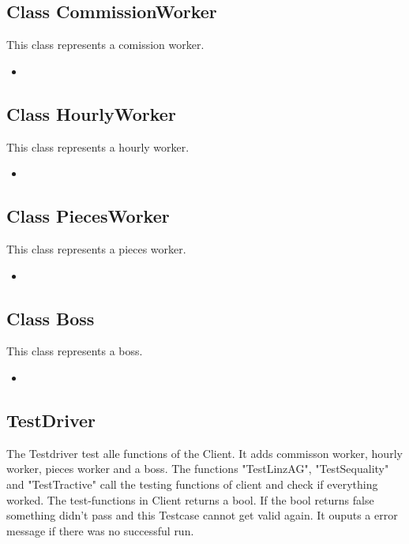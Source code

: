 \subsection{Class CommissionWorker}
This class represents a comission worker.
\begin{itemize}
	\item
\end{itemize}

\subsection{Class HourlyWorker}
This class represents a hourly worker.
\begin{itemize}
	\item
\end{itemize}

\subsection{Class PiecesWorker}
This class represents a pieces worker.
\begin{itemize}
	\item
\end{itemize}

\subsection{Class Boss}
This class represents a boss.
\begin{itemize}
	\item
\end{itemize}

\subsection{TestDriver}
The Testdriver test alle functions of the Client. It adds commisson worker, hourly worker, pieces worker and a boss.
The functions "TestLinzAG", "TestSequality" and "TestTractive" call the testing functions of client and check if everything worked.
The test-functions in Client returns a bool. If the bool returns false something didn't pass and this Testcase cannot get valid again.
It ouputs a error message if there was no successful run.

\newpage
